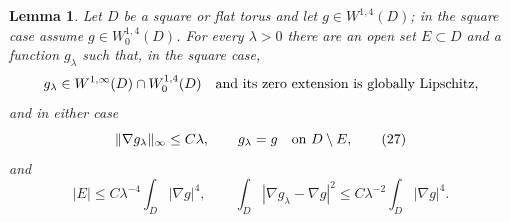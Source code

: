 \documentclass{aomart}
\newtheorem{lemma}[theorem]{Lemma}
\theoremstyle{definition}
\newcommand{\1}{\mathbf 1}
\begin{document}
\begin{lemma}\label{lem:lipschitz-truncation}
Let $D$ be a square or flat torus and let $g\in W^{1,4}(D)$; in the
square case assume $g\in W^{1,4}_ 0(D)$.  For every $\lambda>0$ there
are an open set $E\subset D$ and a function $g_ \lambda$ such that, in
the square case,
\begin{equation*}
g_ \lambda\in W^{1,\infty}(D)\cap W^{1,4}_ 0(D)
\quad\hbox{and its zero extension is globally Lipschitz},
\end{equation*}
and in either case
\begin{equation}
\|\nabla g_ \lambda\|_ \infty\leq C\lambda,\qquad
g_ \lambda=g\quad\hbox{on }D\setminus E,
\tag{27}
\end{equation}
and
\begin{equation}
|E|\leq C\lambda^{-4}\int_ D|\nabla g|^4,
\qquad
\int_ D|\nabla g_ \lambda-\nabla g|^2
\leq C\lambda^{-2}\int_ D|\nabla g|^4.
\tag{28}
\end{equation}

\end{lemma}
\end{document}
